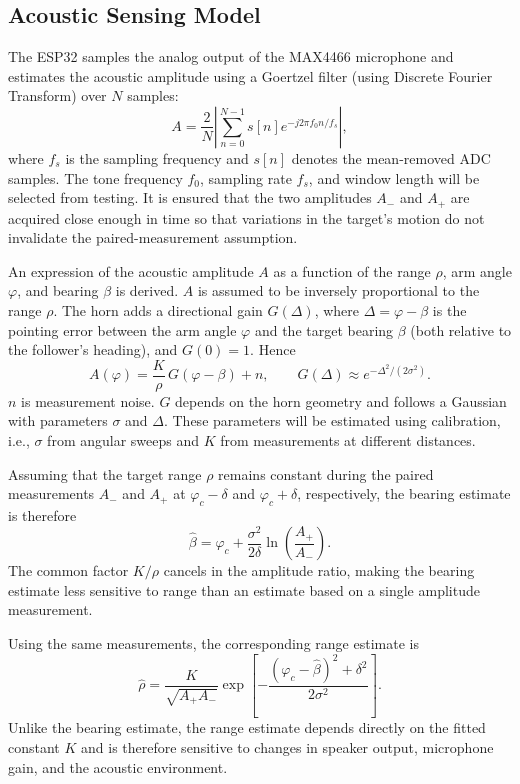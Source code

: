 \documentclass[journal,a4paper]{IEEEtran}
\begin{document}
\subsection{Acoustic Sensing Model}
\label{sec:sensing}
The ESP32 samples the analog output of the MAX4466 microphone and estimates the acoustic amplitude using a Goertzel filter \cite{goertzel} (using Discrete Fourier Transform) over $N$ samples:
\begin{equation}
A=
\frac{2}{N}
\left|
\sum_{n=0}^{N-1}
s[n]e^{-j2\pi f_0 n/f_s}
\right|,
\label{eq:goertzel}
\end{equation}
where $f_s$ is the sampling frequency and $s[n]$ denotes the mean-removed ADC samples. The tone frequency $f_0$, sampling rate $f_s$, and window length will be selected from testing. It is ensured that the two amplitudes $A_-$ and $A_+$ are acquired close enough in time so that variations in the target's motion do not invalidate the paired-measurement assumption.

An expression of the acoustic amplitude $A$ as a function of the range ${\rho}$, arm angle $\varphi$, and bearing ${\beta}$ is derived. $A$ is assumed to be inversely proportional to the range ${\rho}$. The horn adds a directional gain $G(\Delta)$, where $\Delta=\varphi-\beta$ is the pointing error between the arm angle $\varphi$
and the target bearing $\beta$ (both relative to the follower's heading), and
$G(0)=1$. Hence
\begin{equation}
A(\varphi)=\frac{K}{\rho}\,G(\varphi-\beta)+n,\qquad
G(\Delta)\approx e^{-\Delta^{2}/(2\sigma^{2})}.
\label{eq:amp}
\end{equation}
$n$ is measurement noise. $G$ depends on the horn geometry and follows a Gaussian with parameters $\sigma$ and $\Delta$. These parameters will be estimated using calibration, i.e., $\sigma$ from angular sweeps and $K$ from measurements at different distances.

Assuming that the target range ${\rho}$ remains constant during the paired measurements $A_-$ and $A_+$ at $\varphi_c-\delta$ and $\varphi_c+\delta$, respectively, the bearing estimate is therefore
\begin{equation}
\hat{\beta}
=
\varphi_c+
\frac{\sigma^2}{2\delta}
\ln\left(\frac{A_+}{A_-}\right).
\label{eq:beta}
\end{equation}
The common factor $K/\rho$ cancels in the amplitude ratio, making the bearing estimate less sensitive to range than an estimate based on a single amplitude measurement.

Using the same measurements, the corresponding range estimate is
\begin{equation}
\hat{\rho}
=
\frac{K}{\sqrt{A_+A_-}}
\exp\left[
-\frac{(\varphi_c-\hat{\beta})^2+\delta^2}
{2\sigma^2}
\right].
\label{eq:rho}
\end{equation}
Unlike the bearing estimate, the range estimate depends directly on the fitted constant $K$ and is therefore sensitive to changes in speaker output, microphone gain, and the acoustic environment.
\end{document}
